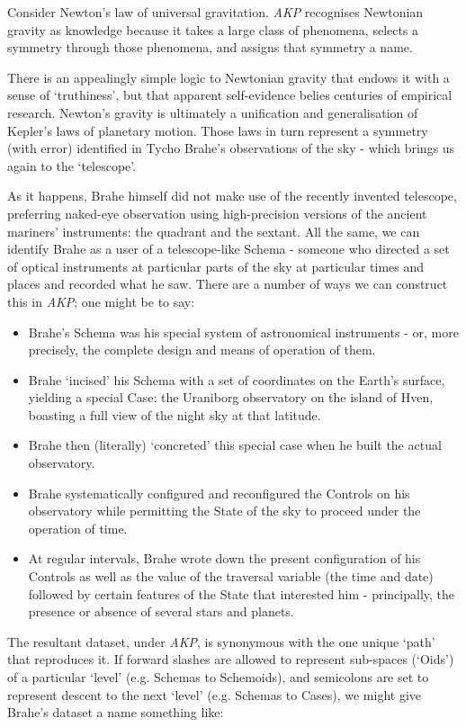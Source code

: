 \documentclass[a4paper,11pt,oneside]{book}
\begin{document}
Consider Newton's law of universal gravitation. \textit{AKP} recognises Newtonian gravity as knowledge because it takes a large class of phenomena, selects a symmetry through those phenomena, and assigns that symmetry a name.

There is an appealingly simple logic to Newtonian gravity that endows it with a sense of `truthiness', but that apparent self-evidence belies centuries of empirical research. Newton's gravity is ultimately a unification and generalisation of Kepler's laws of planetary motion. Those laws in turn represent a symmetry (with error) identified in Tycho Brahe's observations of the sky - which brings us again to the `telescope'.

As it happens, Brahe himself did not make use of the recently invented telescope, preferring naked-eye observation using high-precision versions of the ancient mariners' instruments: the quadrant and the sextant. All the same, we can identify Brahe as a user of a telescope-like Schema - someone who directed a set of optical instruments at particular parts of the sky at particular times and places and recorded what he saw. There are a number of ways we can construct this in \textit{AKP}; one might be to say:

\begin{itemize}
\item Brahe's Schema was his special system of astronomical instruments - or, more precisely, the complete design and means of operation of them.
\item Brahe `incised' his Schema with a set of coordinates on the Earth's surface, yielding a special Case: the Uraniborg observatory on the island of Hven, boasting a full view of the night sky at that latitude.
\item Brahe then (literally) `concreted' this special case when he built the actual observatory.
\item Brahe systematically configured and reconfigured the Controls on his observatory while permitting the State of the sky to proceed under the operation of time.
\item At regular intervals, Brahe wrote down the present configuration of his Controls as well as the value of the traversal variable (the time and date) followed by certain features of the State that interested him - principally, the presence or absence of several stars and planets.
\end{itemize}

The resultant dataset, under \textit{AKP}, is synonymous with the one unique `path' that reproduces it. If forward slashes are allowed to represent sub-spaces (`Oids') of a particular `level' (e.g. Schemas to Schemoids), and semicolons are set to represent descent to the next `level' (e.g. Schemas to Cases), we might give Brahe's dataset a name something like:
\end{document}
